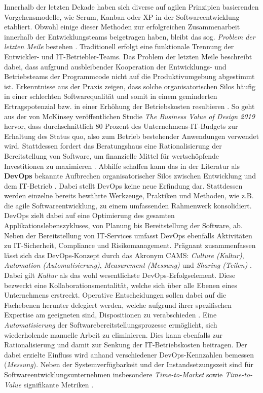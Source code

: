 Innerhalb der letzten Dekade haben sich diverse auf agilen Prinzipien basierenden Vorgehensmodelle, wie Scrum, Kanban oder \ac{XP} in der Softwareentwicklung etabliert. Obwohl einige dieser Methoden zur erfolgreichen Zusammenarbeit innerhalb der Entwicklungsteams beigetragen haben, bleibt das sog.  \textit{Problem der letzten Meile} bestehen \cite{Qentelli.20230305}. Traditionell erfolgt eine funktionale Trennung der Entwickler- und IT-Betriebler-Teams. Das Problem der letzten Meile beschreibt dabei, dass aufgrund ausbleibender Kooperation der Entwicklungs- und Betriebsteams der Programmcode nicht auf die Produktivumgebung abgestimmt ist. Erkenntnisse aus der Praxis zeigen, dass solche organisatorischen Silos häufig in einer schlechten Softwarequalität und somit in einem geminderten Ertragspotenzial bzw. in einer Erhöhung der Betriebskosten resultieren \cite[1]{Halstenberg.2020}. So geht aus der von McKinsey veröffentlichen Studie \textit{The Business Value of Design 2019} hervor, dass durchschnittlich 80 Prozent des Unternehmens-IT-Budgets zur Erhaltung des Status quo, also zum Betrieb bestehender Anwendungen verwendet wird. Stattdessen fordert das Beratungshaus eine Rationalisierung der Bereitstellung von Software, um finanzielle Mittel für wertschöpfende Investitionen zu maximieren \cite{.20230305}. Abhilfe schaffen kann das in der Literatur als \textbf{\ac{DevOps}} bekannte Aufbrechen organisatorischer Silos zwischen Entwicklung und dem IT-Betrieb \cite[1]{Halstenberg.2020}. 
Dabei stellt DevOps keine neue Erfindung dar. Stattdessen werden einzelne bereits bewährte Werkzeuge, Praktiken und Methoden, wie z.B. die agile Softwareentwicklung, zu einem umfassenden Rahmenwerk konsolidiert. DevOps zielt dabei auf eine Optimierung des gesamten Applikationslebenszykluses, von Planung bis Bereitstellung der Software, ab. Neben der Bereitstellung von IT-Services umfasst DevOps ebenfalls Aktivitäten zu IT-Sicherheit, Compliance und Risikomanagement. Prägnant zusammenfassen lässt sich das DevOps-Konzept durch das Akronym CAMS: \textit{Culture (Kultur)}, \textit{Automation (Automatisierung)}, \textit{Measurement (Messung)} und \textit{Sharing (Teilen)} \cite[5]{Halstenberg.2020}. Dabei gilt \textit{Kultur} als das wohl wesentlichste DevOps-Erfolgselement. Diese bezweckt eine Kollaborationsmentalität, welche sich über alle Ebenen eines Unternehmens erstreckt. Operative Entscheidungen sollen dabei auf die Fachebenen herunter delegiert werden, welche aufgrund ihrer spezifischen Expertise am geeigneten sind, Dispositionen zu verabschieden \cite[5]{Halstenberg.2020}. Eine \textit{Automatisierung} der Softwarebereitstellungsprozesse ermöglicht, sich wiederholende manuelle Arbeit zu eliminieren. Dies kann ebenfalls zur Rationalisierung und damit zur Senkung der IT-Betriebskosten beitragen. Der dabei erzielte Einfluss wird anhand verschiedener DevOps-Kennzahlen bemessen (\textit{Messung}). Neben der Systemverfügbarkeit und der Instandsetzungszeit sind für Softwareentwicklungsunternehmen insbesondere \textit{Time-to-Market} sowie \textit{Time-to-Value} signifikante Metriken \cite[7]{Halstenberg.2020}. 
